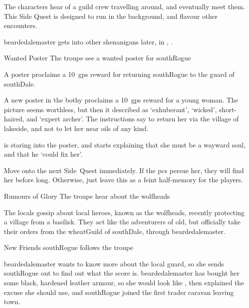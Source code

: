 \label{wolfHeads}

\noindent
The characters hear of a guild crew travelling around, and eventually meet them.
This Side Quest is designed to run in the background, and flavour other encounters.

\Gls{beardedalemaster} gets into other shenanigans later, in , .

{\squash Wanted Poster}%
{The troupe see a wanted poster for \gls{southRogue}}%

A poster proclaims a 10~\glspl{gp} reward for returning \gls{southRogue} to the \gls{guard} of \gls{southDale}.

\begin{boxtext}
  A new poster in the \gls{bothy} proclaims a 10~\glspl{gp} reward for a young woman.
  The picture seems worthless, but then it described as `exhuberant', `wicked', short-haired, and `expert archer'.
  The instructions say to return her via the \gls{village} of \gls{lakeside}, and not to let her near oils of any kind.

   is staring into the poster, and starts explaining that she must be a wayward soul, and that he `could fix her'.
\end{boxtext}

Move onto the next Side~Quest immediately.
If the \glspl{pc} persue her, they will find her before long.
Otherwise, just leave this as a feint half-memory for the players.

{\squash Rumours of Glory}%
{The troupe hear about the \glspl{wolfhead}}%

The locals gossip about local heroes, known as the \glspl{wolfhead}, recently protecting a \gls{village} from a basilisk.
They act like the adventurers of old, but officially take their orders from the \gls{wheatGuild} of \gls{southDale}, through \gls{beardedalemaster}.

{New Friends}%
{\Gls{southRogue} follows the troupe}%

\Gls{beardedalemaster} wants to know more about the local \gls{guard}, so she sends \gls{southRogue} out to find out what the score is.
\Gls{beardedalemaster} has bought her some black, hardened leather armour, so she would look like , then explained the excuse she should use, and \gls{southRogue} joined the first trader caravan leaving \gls{town}.

